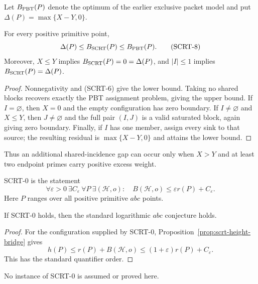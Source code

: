 Let $B_{\rm PBT}(P)$ denote the optimum of the earlier exclusive packet
model and put $\Delta(P)=\max\{X-Y,0\}$.

\begin{proposition}
\label{prop:scrt-sandwich}
For every positive primitive point,
\[
 \Delta(P)\le B_{\rm SCRT}(P)\le B_{\rm PBT}(P).            \tag{SCRT-8}
\]
Moreover, $X\le Y$ implies $B_{\rm SCRT}(P)=0=\Delta(P)$, and
$|I|\le1$ implies $B_{\rm SCRT}(P)=\Delta(P)$.
\end{proposition}

\begin{proof}
Nonnegativity and (SCRT-6) give the lower bound.  Taking no shared blocks
recovers exactly the PBT assignment problem, giving the upper bound.  If
$I=\varnothing$, then $X=0$ and the empty configuration has zero boundary.
If $I\ne\varnothing$ and $X\le Y$, then $J\ne\varnothing$ and the full pair
$(I,J)$ is a valid saturated block, again giving zero boundary.  Finally, if
$I$ has one member, assign every sink to that source; the resulting residual
is $\max\{X-Y,0\}$ and attains the lower bound.
\end{proof}

Thus an additional shared-incidence gap can occur only when $X>Y$ and at
least two endpoint primes carry positive excess weight.

\begin{definition}
SCRT-0 is the statement
\[
 \forall\varepsilon>0\ \exists C_\varepsilon\ \forall P\
 \exists(\mathcal H,o):\quad
 B(\mathcal H,o)\le\varepsilon r(P)+C_\varepsilon.          \tag{SCRT-0}
\]
Here $P$ ranges over all positive primitive $abc$ points.
\end{definition}

\begin{theorem}
\label{thm:scrt-implies-abc}
If SCRT-0 holds, then the standard logarithmic $abc$ conjecture holds.
\end{theorem}

\begin{proof}
For the configuration supplied by SCRT-0, Proposition~\ref{prop:scrt-height-bridge}
gives
\[
 h(P)\le r(P)+B(\mathcal H,o)
       \le(1+\varepsilon)r(P)+C_\varepsilon.
\]
This has the standard quantifier order.
\end{proof}

No instance of SCRT-0 is assumed or proved here.

